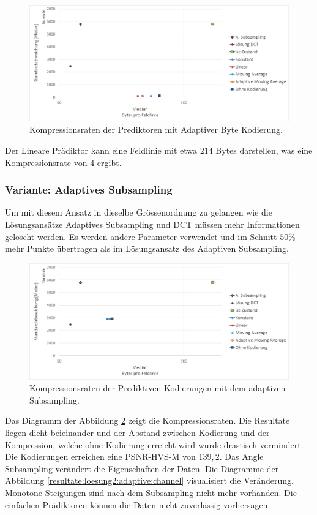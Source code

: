 \begin{figure}[!htbp]
	\center
	\includegraphics[width=1\textwidth,keepaspectratio]{./pictures/resultate/loesung2/variante0/resultate_byte.png}
	\caption{Kompressionsraten der Prediktoren mit Adaptiver Byte Kodierung.}
	\label{resultate:loesung2:simple:resultate_byte}
\end{figure}
Der Lineare Prädiktor kann eine Feldlinie mit etwa $214$ Bytes darstellen, was eine Kompressionsrate von $4$ ergibt.

\subsubsection{Variante: Adaptives Subsampling}
Um mit diesem Ansatz in dieselbe Grössenordnung zu gelangen wie die Lösungsansätze Adaptives Subsampling und DCT müssen mehr Informationen gelöscht werden. Es werden andere Parameter verwendet und im Schnitt $50\%$ mehr Punkte übertragen als im Lösungsansatz des Adaptiven Subsampling.

\begin{figure}[!htbp]
	\center
	\includegraphics[width=1\textwidth,keepaspectratio]{./pictures/resultate/loesung2/variante1/resultate_euler.png}
	\caption{Kompressionsraten der Prediktiven Kodierungen mit dem adaptiven Subsampling.}
	\label{resultate:loesung2:adaptive:euler}
\end{figure}
Das Diagramm der Abbildung \ref{resultate:loesung2:adaptive:euler} zeigt die Kompressionsraten. Die Resultate liegen dicht beieinander und der Abstand zwischen Kodierung und der Kompression, welche ohne Kodierung erreicht wird wurde drastisch vermindert. Die Kodierungen erreichen eine PSNR-HVS-M von $139,2$. Das Angle Subsampling verändert die Eigenschaften der Daten. Die Diagramme der Abbildung \ref{resultate:loesung2:adaptive:channel} visualisiert die Veränderung. Monotone Steigungen sind nach dem Subsampling nicht mehr vorhanden. Die einfachen Prädiktoren können die Daten nicht zuverlässig vorhersagen.

